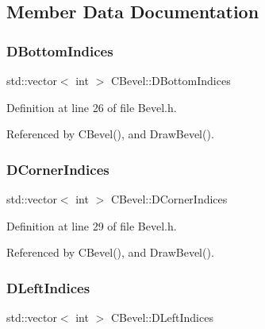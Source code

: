 \subsection{Member Data Documentation}
\hypertarget{classCBevel_a1593dec2a677674416284cba85516d5a}{}\label{classCBevel_a1593dec2a677674416284cba85516d5a} 
\subsubsection{\texorpdfstring{D\+Bottom\+Indices}{DBottomIndices}}
{\footnotesize\ttfamily std\+::vector$<$ int $>$ C\+Bevel\+::\+D\+Bottom\+Indices\hspace{0.3cm}{\ttfamily [protected]}}



Definition at line 26 of file Bevel.\+h.



Referenced by C\+Bevel(), and Draw\+Bevel().

\hypertarget{classCBevel_ab5e1c6e9de178bdfbdb87796945a289e}{}\label{classCBevel_ab5e1c6e9de178bdfbdb87796945a289e} 
\subsubsection{\texorpdfstring{D\+Corner\+Indices}{DCornerIndices}}
{\footnotesize\ttfamily std\+::vector$<$ int $>$ C\+Bevel\+::\+D\+Corner\+Indices\hspace{0.3cm}{\ttfamily [protected]}}



Definition at line 29 of file Bevel.\+h.



Referenced by C\+Bevel(), and Draw\+Bevel().

\hypertarget{classCBevel_a8ae622f8be35f17dbb6e492864bae9ce}{}\label{classCBevel_a8ae622f8be35f17dbb6e492864bae9ce} 
\subsubsection{\texorpdfstring{D\+Left\+Indices}{DLeftIndices}}
{\footnotesize\ttfamily std\+::vector$<$ int $>$ C\+Bevel\+::\+D\+Left\+Indices\hspace{0.3cm}{\ttfamily [protected]}}



